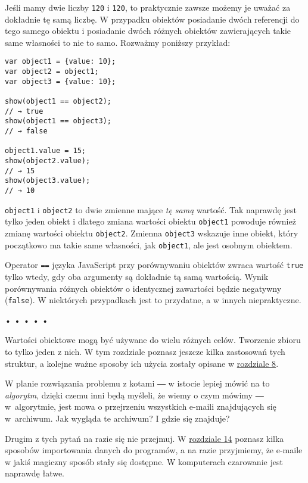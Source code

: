     
Jeśli mamy dwie liczby \texttt{120} i \texttt{120}, to praktycznie zawsze możemy je uważać za dokładnie tę samą liczbę. W przypadku obiektów posiadanie dwóch referencji do tego samego obiektu i posiadanie dwóch różnych obiektów zawierających takie same własności to nie to samo. Rozważmy poniższy przykład:

    
\begin{verbatim} 
var object1 = {value: 10};
var object2 = object1;
var object3 = {value: 10};

show(object1 == object2);
// → true
show(object1 == object3);
// → false

object1.value = 15;
show(object2.value);
// → 15
show(object3.value);
// → 10
 \end{verbatim}
    
\texttt{object1} i \texttt{object2} to dwie zmienne mające \emph{tę samą} wartość. Tak naprawdę jest tylko jeden obiekt i dlatego zmiana wartości obiektu \texttt{object1} powoduje również zmianę wartości obiektu \texttt{object2}. Zmienna \texttt{object3} wskazuje inne obiekt, który początkowo ma takie same własności, jak \texttt{object1}, ale jest osobnym obiektem.

    
Operator \texttt{==}\index{==} języka JavaScript przy porównywaniu obiektów zwraca wartość \texttt{true} tylko wtedy, gdy oba argumenty są dokładnie tą samą wartością. Wynik porównywania różnych obiektów o identycznej zawartości będzie negatywny (\texttt{false}). W niektórych przypadkach jest to przydatne, a w innych niepraktyczne.

  
  
\begin{center}
• • • • •
\end{center}
  
    
Wartości obiektowe mogą być używane do wielu różnych celów. Tworzenie zbioru to tylko jeden z nich. W tym rozdziale poznasz jeszcze kilka zastosowań tych struktur, a kolejne ważne sposoby ich użycia zostały opisane w \hyperref[chap:8]{rozdziale 8}.

    
W planie rozwiązania problemu z kotami ― w istocie lepiej mówić na to \emph{algorytm}, dzięki czemu inni będą myśleli, że wiemy o czym mówimy ― w~algorytmie, jest mowa o przejrzeniu wszystkich e-maili znajdujących się w~archiwum. Jak wygląda te archiwum? I gdzie się znajduje?

    
Drugim z tych pytań na razie się nie przejmuj. W \hyperref[chap:14]{rozdziale 14} poznasz kilka sposobów importowania danych do programów, a na razie przyjmiemy, że e-maile w jakiś magiczny sposób stały się dostępne. W komputerach czarowanie jest naprawdę łatwe.

